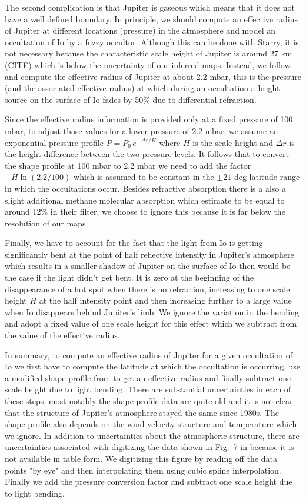 \documentclass[modern]{aastex62}
\begin{document}
The second complication is that Jupiter is gaseous which means that it does not have a well defined boundary.
In principle, we should compute an effective radius of Jupiter at different locations (pressure) in the atmosphere and model an occultation of Io by a fuzzy occultor.
Although this can be done with Starry, it is not necessary because the characteristic scale height of Jupiter is around 27 km (CITE) which is below the uncertainty of our inferred maps.
Instead, we follow \cite{spencer1990} and compute the effective radius of Jupiter at about 2.2 mbar, this is the pressure (and the associated effective radius) at which during an occultation a bright source on the surface of Io fades by 50\% due to differential refraction.

Since the effective radius information is provided only at a fixed pressure of 100 mbar, 
to adjust those values for a lower pressure of 2.2 mbar, we assume an exponential pressure profile $P=P_0\, e^{-\Delta r/H}$ where $H$ is the scale height and $\Delta r$ is the height difference between the two pressure levels.
It follows that to convert the shape profile at 100 mbar to 2.2 mbar we need to add the factor
$-H\ln(2.2/100)$ which is assumed to be constant in the $\pm 21$ deg latitude range in which the occultations occur.
Besides refractive absorption there is a also a slight additional methane molecular absorption which \cite{spencer1990} estimate to be equal to around 12\% in their filter, 
we choose to ignore this because it is far below the resolution of our maps.

Finally, we have to account for the fact that the light from Io is getting significantly bent at the point of half reflective intensity in Jupiter's atmosphere 
which results in a smaller shadow of Jupiter on the surface of Io then would be the case if the light didn't get bent.
It is zero at the beginning of the disappearance of a hot spot when there is no refraction, increasing to one scale height $H$ at the half intensity point and then increasing further to a large value when Io disappears behind Jupiter's limb.
We ignore the variation in the bending and adopt a fixed value of one scale height for this effect which we subtract from the value of the effective radius.

In summary, to compute an effective radius of Jupiter for a given occultation of Io we first have to compute the latitude at which the occultation is occurring, use a modified shape profile from \cite{lindal1981} to get an effective radius and finally subtract one scale height due to light bending.
There are substantial uncertainties in each of these steps, most notably the shape profile data are quite old and it is not clear that the structure of Jupiter's atmosphere stayed the same since 1980s. 
The shape profile also depends on the wind velocity structure and temperature which we ignore.
In addition to uncertainties about the atmospheric structure, there are uncertainties associated with digitizing the data shown in Fig.~7 in \cite{lindal1981} because it is not available in table form.
We digitizing this figure by reading off the data points "by eye" and then interpolating them using cubic spline interpolation.
Finally we add the pressure conversion factor and subtract one scale height due to light bending.
\end{document}
